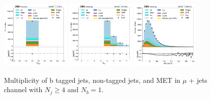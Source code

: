 \begin{figure}[htb!]
    \centering
    \includegraphics[width=0.3\textwidth]{chapters/Appendix/sectionPlots/figures/data_mc_overlays/mujet_2016_cat_gt4_eq1_signal_linear_jet_n_bjets}
    \includegraphics[width=0.3\textwidth]{chapters/Appendix/sectionPlots/figures/data_mc_overlays/mujet_2016_cat_gt4_eq1_signal_linear_jet_n_jets}
    \includegraphics[width=0.3\textwidth]{chapters/Appendix/sectionPlots/figures/data_mc_overlays/mujet_2016_cat_gt4_eq1_signal_linear_misc_met_mag}
    \caption{Multiplicity of b tagged jets, non-tagged jets, and MET in
    $\mu$ + jets channel with $N_{j} \geq 4$ and $N_{b} = 1$.
    \label{fig:mujet_1_jetmet}}
\end{figure}

